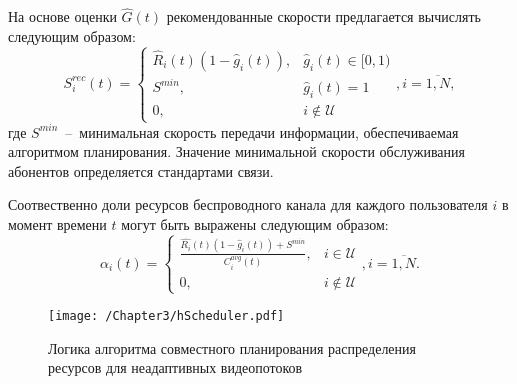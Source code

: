 На основе оценки $\hat{G}(t)$ рекомендованные скорости предлагается вычислять следующим образом:
\begin{equation}
\label{eq:SReqCalc}
S^{rec}_i(t) =
\begin{cases}
\hat{R}_i(t) (1 - \hat{g}_i(t)), & \hat{g}_i(t) \in [0,1) \\
S^{min}, &  \hat{g}_i(t) = 1 \\
0,& i \notin \mathcal{U}
\end{cases}, i = \overline{1,N},
\end{equation}
где $S^{min}$~--~минимальная скорость передачи информации, обеспечиваемая алгоритмом планирования. Значение минимальной скорости обслуживания абонентов определяется стандартами связи.

Соотвественно доли ресурсов беспроводного канала для каждого пользователя $i$ в момент времени $t$ могут быть выражены следующим образом:
$$\alpha_i(t) = \begin{cases}
					\frac{\hat{R_i}(t) (1 - \hat{g}_i(t)) + S^{min}}{C^{avg}_i(t)}, & i \in \mathcal{U}  \\
					0, & i \notin \mathcal{U}
					\end{cases}, i = \overline{1,N}.$$

\begin{figure}[htbp]
\begin{center}
\texttt{[image: /Chapter3/hScheduler.pdf]}
\caption{Логика алгоритма совместного планирования распределения ресурсов для неадаптивных видеопотоков}
\label{fig:HScheduler}
\end{center}
\end{figure}


